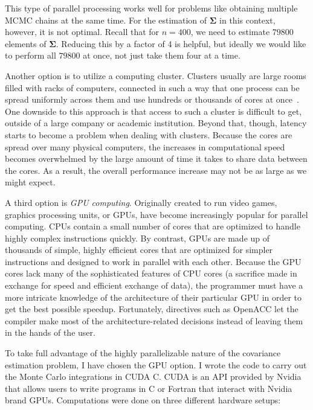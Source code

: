 This type of parallel processing works well for problems like obtaining multiple MCMC chains at the same time. For the estimation of $\bm{\Sigma}$ in this context, however, it is not optimal. Recall that for $n = 400$, we need to estimate $79800$ elements of $\bm{\Sigma}$. Reducing this by a factor of 4 is helpful, but ideally we would like to perform all $79800$ at once, not just take them four at a time.

Another option is to utilize a computing cluster. Clusters usually are large rooms filled with racks of computers, connected in such a way that one process can be spread uniformly across them and use hundreds or thousands of cores at once~\cite{suchard2010understanding}. One downside to this approach is that access to such a cluster is difficult to get, outside of a large company or academic institution. Beyond that, though, latency starts to become a problem when dealing with clusters. Because the cores are spread over many physical computers, the increases in computational speed becomes overwhelmed by the large amount of time it takes to share data between the cores. As a result, the overall performance increase may not be as large as we might expect.

A third option is \emph{GPU computing}. Originally created to run video games, graphics processing units, or GPUs, have become increasingly popular for parallel computing. CPUs contain a small number of cores that are optimized to handle highly complex instructions quickly. By contrast, GPUs are made up of thousands of simple, highly efficient cores that are optimized for simpler instructions and designed to work in parallel with each other. Because the GPU cores lack many of the sophisticated features of CPU cores (a sacrifice made in exchange for speed and efficient exchange of data), the programmer must have a more intricate knowledge of the architecture of their particular GPU in order to get the best possible speedup. Fortunately, directives such as OpenACC let the compiler make most of the architecture-related decisions instead of leaving them in the hands of the user.

To take full advantage of the highly parallelizable nature of the covariance estimation problem, I have chosen the GPU option. I wrote the code to carry out the Monte Carlo integrations in CUDA C. CUDA is an API provided by Nvidia that allows users to write programs in C or Fortran that interact with Nvidia brand GPUs. Computations were done on three different hardware setups:

